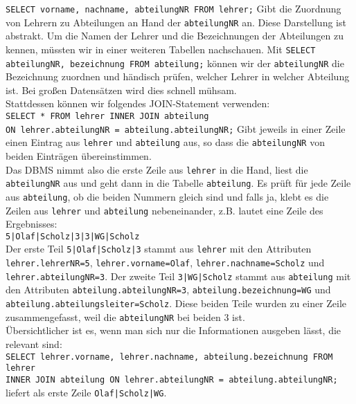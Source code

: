 \lstinline!SELECT vorname, nachname, abteilungNR FROM lehrer;!
Gibt die Zuordnung von Lehrern zu Abteilungen an Hand der \lstinline!abteilungNR! an. Diese Darstellung ist abstrakt. Um die Namen der Lehrer und die Bezeichnungen der Abteilungen zu kennen, müssten wir in einer weiteren Tabellen nachschauen. Mit \lstinline!SELECT abteilungNR, bezeichnung FROM abteilung;! können wir der \lstinline!abteilungNR! die Bezeichnung zuordnen und händisch prüfen, welcher Lehrer in welcher Abteilung ist. Bei großen Datensätzen wird dies schnell mühsam.\\
Stattdessen können wir folgendes JOIN-Statement verwenden:\\
\lstinline!SELECT * FROM lehrer INNER JOIN abteilung!\\
\lstinline!ON lehrer.abteilungNR = abteilung.abteilungNR;!
Gibt jeweils in einer Zeile einen Eintrag aus \lstinline!lehrer! und \lstinline!abteilung! aus, so dass die \lstinline!abteilungNR! von beiden Einträgen übereinstimmen.\\
Das DBMS nimmt also die erste Zeile aus \lstinline!lehrer! in die Hand, liest die \lstinline!abteilungNR! aus und geht dann in die Tabelle \lstinline!abteilung!. Es prüft für jede Zeile aus \lstinline!abteilung!, ob die beiden Nummern gleich sind und falls ja, klebt es die Zeilen aus \lstinline!lehrer! und \lstinline!abteilung! nebeneinander, z.B. lautet eine Zeile des Ergebnisses:\\
\lstinline!5|Olaf|Scholz|3|3|WG|Scholz!\\
Der erste Teil \lstinline!5|Olaf|Scholz|3! stammt aus \lstinline!lehrer! mit den Attributen \lstinline!lehrer.lehrerNR=5!, \lstinline!lehrer.vorname=Olaf!, \lstinline!lehrer.nachname=Scholz! und \lstinline!lehrer.abteilungNR=3!. Der zweite Teil \lstinline!3|WG|Scholz! stammt aus \lstinline!abteilung! mit den Attributen \lstinline!abteilung.abteilungNR=3!, \lstinline!abteilung.bezeichnung=WG! und \lstinline!abteilung.abteilungsleiter=Scholz!. Diese beiden Teile wurden zu einer Zeile zusammengefasst, weil die \lstinline!abteilungNR! bei beiden 3 ist.\\
Übersichtlicher ist es, wenn man sich nur die Informationen ausgeben lässt, die relevant sind:\\
\lstinline!SELECT lehrer.vorname, lehrer.nachname, abteilung.bezeichnung FROM lehrer!\\
\lstinline!INNER JOIN abteilung ON lehrer.abteilungNR = abteilung.abteilungNR;!\\
liefert als erste Zeile \lstinline!Olaf|Scholz|WG!.

